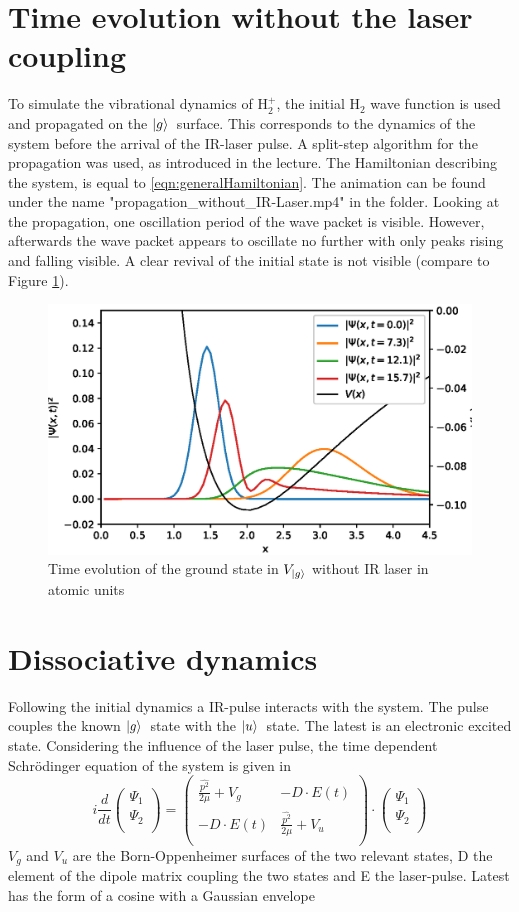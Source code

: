 \documentclass[12pt]{article}
\newcommand{\gr}{$\ket{g}$}
\newcommand{\us}{$\ket{u}$}
\newcommand{\psiv}{\begin{pmatrix}\Psi_1\\ \Psi_2\\ \end{pmatrix}}
\begin{document}
\section{Time evolution without the laser coupling}
To simulate the vibrational dynamics of H$_2^+$, the initial H$_2$ wave function is used and propagated on the \gr\ surface. This corresponds to the dynamics of the system before the arrival of the IR-laser pulse. A split-step algorithm for the propagation was used, as introduced in the lecture. The Hamiltonian describing the system, is equal to \eqref{eqn:generalHamiltonian}.
The animation can be found under the name "propagation\_without\_IR-Laser.mp4"
in the folder.
Looking at the propagation, one oscillation period of the wave packet is visible. However, afterwards the wave packet appears to oscillate no further with only peaks rising and falling visible. A clear revival of the initial state is not visible (compare to Figure \ref{fig:withoutIR}).
\begin{figure}[htb]
    \centering
    \includegraphics[width=1\textwidth]{woIR.eps}
    \caption{Time evolution of the ground state in $V_{\ket{g}}$ without IR laser in atomic units }\label{fig:withoutIR}
\end{figure}


\section{Dissociative dynamics}
Following the initial dynamics a IR-pulse interacts with the system. The pulse couples  the known \gr \ state with the \us \ state. The latest is an electronic excited state. Considering the influence of the laser pulse, the time dependent Schr\"odinger equation of the system is given in \cite{PhysRevA.93.012507}
\begin{equation}\label{eqn:dissociativeDyn}
i
\frac{d}{dt}
\psiv
=
\begin{pmatrix}
\frac{\hat{p^2}}{2\mu}+V_g & -D\cdot E(t)\\
-D\cdot E(t) & \frac{\hat{p^2}}{2\mu}+V_u\\
\end{pmatrix}
\cdot
\psiv
\end{equation}
$V_g$ and $V_u$ are the Born-Oppenheimer surfaces of the two relevant states, D the element of the dipole matrix coupling the two states and E the laser-pulse.
Latest has the form of a cosine with a Gaussian envelope
\end{document}

